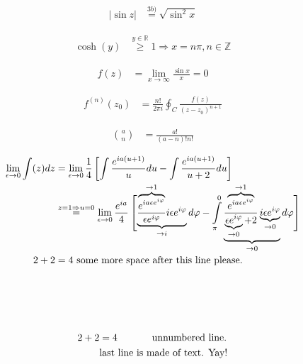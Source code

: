 \documentclass[12pt, a4paper, twopage]{scrartcl}
\newcommand{\limz}[1]{\lim\limits_{#1 \rightarrow 0}}  %
\begin{document}
\begin{align}
	 |\sin z| &\overset{3b)}= \sqrt{\sin^2 x}
\end{align}


\begin{align}
	 \cosh(y) & \overset{y \in \mathbb{R}} \geq 1 \Rightarrow x = n \pi, n \in \mathbb{Z}
\end{align}
	
	
\begin{align}
	 f(z) &= \lim\limits_{x\rightarrow \infty} \frac{\sin x}{x} = 0
\end{align}


\begin{align}
	 f^{(n)} (z_0) &= \frac{n!}{2\pi i} \oint_C  \frac{f(z)}{(z - z_0)^{n + 1}}
\end{align}


\begin{align}
	 \binom{a}{n} &= \frac{a!}{(a-n)! n!}
\end{align}


\begin{align}
	 \nonumber \limz{\epsilon}\int(z) dz &= 
	 	\limz{\epsilon} \frac14 \left[ \int\frac{e^{ia(u + 1)}}{u} du - 
	 	\int\frac{e^{ia(u + 1)}}{u + 2}du   \right]\\[1em]
	 & \overset{z = 1 \Rightarrow u = 0} = 
	 	\limz{\epsilon} \frac{e^{i a}}{4} 
	 	\left[
	 		\vphantom{ \int\limits_{\pi}^0} 
		 	\smash{ 
		 		\underbrace{
		 			\frac{\overbrace{
		 					e^{ia \epsilon e^{i \varphi}}
	 					}^{\rightarrow 1}
 					} {
 						\epsilon e^{i \varphi}
 					} 
 					i \epsilon e^{i \varphi}
	 			}_{\rightarrow i}  
 				d \varphi   -
				\int\limits_{\pi}^0 \underbrace{
					\frac{ 
						\overbrace{
							e^{ia \epsilon e^{i \varphi}}
						}^{\rightarrow 1}
					} {
					\underbrace{
						\epsilon e^{i \varphi}
					}_{\rightarrow 0} + 2} 
				\underbrace{i \epsilon e^{i \varphi}}_{\rightarrow 0}
				}_{\rightarrow 0}  
				d \varphi  
			}
		\right]\\[2em]
	 2 + 2 &= 4 \ \text{some more space after this line please.}\\[4em]\nonumber
\end{align}


\begin{align}
	 \nonumber  2 + 2 &= 4 \text{ \hspace{1cm} unnumbered line.}\\
	 &\text{last line is made of text. Yay!}
\end{align}
\end{document}

